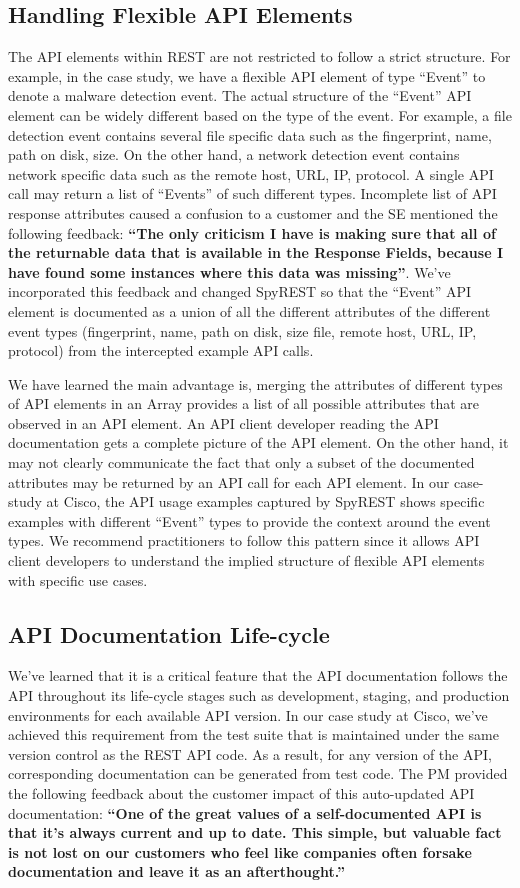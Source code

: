 \subsection{Handling Flexible API Elements}
The API elements within REST are not restricted to follow a strict structure. For example, in the case study, we have a flexible API element of type ``Event'' to denote a malware detection event. The actual structure of the ``Event'' API element can be widely different based on the type of the event. For example, a file detection event contains several file specific data such as the fingerprint, name, path on disk, size. On the other hand, a network detection event contains network specific data such as the remote host, URL, IP, protocol. A single API call may return a list of ``Events'' of such different types. Incomplete list of API response attributes caused a confusion to a customer and the SE mentioned the following feedback: \textbf{``The only criticism I have is making sure that all of the returnable data that is available in the Response Fields, because I have found some instances where this data was missing''}. We've incorporated this feedback and changed SpyREST so that the ``Event'' API element is documented as a union of all the different attributes of the different event types (fingerprint, name, path on disk, size file, remote host, URL, IP, protocol) from the intercepted example API calls.

We have learned the main advantage is, merging the attributes of different types of API elements in an Array provides a list of all possible attributes that are observed in an API element. An API client developer reading the API documentation gets a complete picture of the API element. On the other hand, it may not clearly communicate the fact that only a subset of the documented attributes may be returned by an API call for each API element. In our case-study at Cisco, the API usage examples captured by SpyREST shows specific examples with different ``Event'' types to provide the context around the event types. We recommend practitioners to follow this pattern since it allows API client developers to understand the implied structure of flexible API elements with specific use cases.

\subsection{API Documentation Life-cycle}
We've learned that it is a critical feature that the API documentation follows the API throughout its life-cycle stages such as development, staging, and production environments for each available API version. In our case study at Cisco, we've achieved this requirement from the test suite that is maintained under the same version control as the REST API code. As a result, for any version of the API, corresponding documentation can be generated from test code. The PM provided the following feedback about the customer impact of this auto-updated API documentation: \textbf{``One of the great values of a self-documented API is that it's always current and up to date. This simple, but valuable fact is not lost on our customers who feel like companies often forsake documentation and leave it as an afterthought.''}

